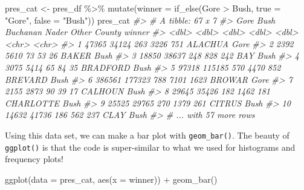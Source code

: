 \documentclass[
]{book}
\newenvironment{Shaded}{\begin{snugshade}}{\end{snugshade}}
\newcommand{\AttributeTok}[1]{\textcolor[rgb]{0.77,0.63,0.00}{#1}}
\newcommand{\CommentTok}[1]{\textcolor[rgb]{0.56,0.35,0.01}{\textit{#1}}}
\newcommand{\FunctionTok}[1]{\textcolor[rgb]{0.00,0.00,0.00}{#1}}
\newcommand{\NormalTok}[1]{#1}
\newcommand{\OtherTok}[1]{\textcolor[rgb]{0.56,0.35,0.01}{#1}}
\newcommand{\SpecialCharTok}[1]{\textcolor[rgb]{0.00,0.00,0.00}{#1}}
\newcommand{\StringTok}[1]{\textcolor[rgb]{0.31,0.60,0.02}{#1}}
\begin{document}
\begin{Shaded}
\begin{Highlighting}[]
\NormalTok{pres\_cat }\OtherTok{\textless{}{-}}\NormalTok{ pres\_df }\SpecialCharTok{\%\textgreater{}\%} \FunctionTok{mutate}\NormalTok{(}\AttributeTok{winner =} \FunctionTok{if\_else}\NormalTok{(Gore }\SpecialCharTok{\textgreater{}}\NormalTok{ Bush,}
                                                \AttributeTok{true =} \StringTok{"Gore"}\NormalTok{,}
                                                \AttributeTok{false =} \StringTok{"Bush"}\NormalTok{))}
\NormalTok{pres\_cat}
\CommentTok{\#\textgreater{} \# A tibble: 67 x 7}
\CommentTok{\#\textgreater{}      Gore   Bush Buchanan Nader Other County    winner}
\CommentTok{\#\textgreater{}     \textless{}dbl\textgreater{}  \textless{}dbl\textgreater{}    \textless{}dbl\textgreater{} \textless{}dbl\textgreater{} \textless{}dbl\textgreater{} \textless{}chr\textgreater{}     \textless{}chr\textgreater{} }
\CommentTok{\#\textgreater{}  1  47365  34124      263  3226   751 ALACHUA   Gore  }
\CommentTok{\#\textgreater{}  2   2392   5610       73    53    26 BAKER     Bush  }
\CommentTok{\#\textgreater{}  3  18850  38637      248   828   242 BAY       Bush  }
\CommentTok{\#\textgreater{}  4   3075   5414       65    84    35 BRADFORD  Bush  }
\CommentTok{\#\textgreater{}  5  97318 115185      570  4470   852 BREVARD   Bush  }
\CommentTok{\#\textgreater{}  6 386561 177323      788  7101  1623 BROWAR    Gore  }
\CommentTok{\#\textgreater{}  7   2155   2873       90    39    17 CALHOUN   Bush  }
\CommentTok{\#\textgreater{}  8  29645  35426      182  1462   181 CHARLOTTE Bush  }
\CommentTok{\#\textgreater{}  9  25525  29765      270  1379   261 CITRUS    Bush  }
\CommentTok{\#\textgreater{} 10  14632  41736      186   562   237 CLAY      Bush  }
\CommentTok{\#\textgreater{} \# ... with 57 more rows}
\end{Highlighting}
\end{Shaded}

Using this data set, we can make a bar plot with \texttt{geom\_bar()}. The beauty of \texttt{ggplot()} is that the code is super-similar to what we used for histograms and frequency plots!

\begin{Shaded}
\begin{Highlighting}[]
\FunctionTok{ggplot}\NormalTok{(}\AttributeTok{data =}\NormalTok{ pres\_cat, }\FunctionTok{aes}\NormalTok{(}\AttributeTok{x =}\NormalTok{ winner)) }\SpecialCharTok{+}
  \FunctionTok{geom\_bar}\NormalTok{()}
\end{Highlighting}
\end{Shaded}
\end{document}
